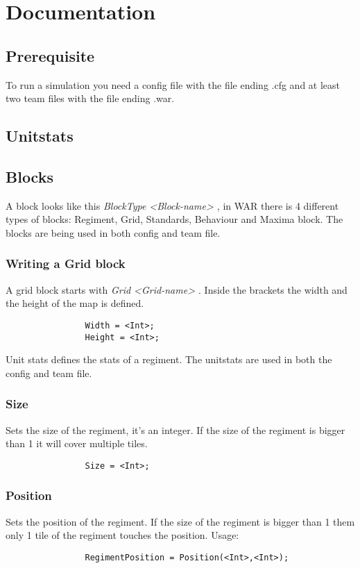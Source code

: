 \section{Documentation}
	\subsection{Prerequisite}
		To run a simulation you need a config file with the file ending .cfg and at least two team files
		with the file ending .war.
	\subsection{Unitstats}
	\subsection{Blocks}
		A block looks like this {\it BlockType <Block-name> { } }, in WAR there is 4 different types of blocks: 
		Regiment, Grid, Standards, Behaviour and Maxima block. The blocks are being used in both config and team file.
		\subsubsection{Writing a Grid block}
			A grid block starts with {\it Grid <Grid-name> { }}. Inside the brackets the width and the height of the map is defined.
			\begin{verbatim}
				Width = <Int>;
				Height = <Int>;
			\end{verbatim}
		Unit stats defines the stats of a regiment. The unitstats are used in both the config and team file.
		\subsubsection{Size}
			Sets the size of the regiment, it's an integer.
			If the size of the regiment is bigger than 1 it will cover multiple tiles.
			\begin{verbatim}
				Size = <Int>;
			\end{verbatim}
		\subsubsection{Position}
			Sets the position of the regiment. If the size of the regiment is bigger than 1 them 
			only 1 tile of the regiment touches the position. Usage: 
			\begin{verbatim}
				RegimentPosition = Position(<Int>,<Int>);
			\end{verbatim}
